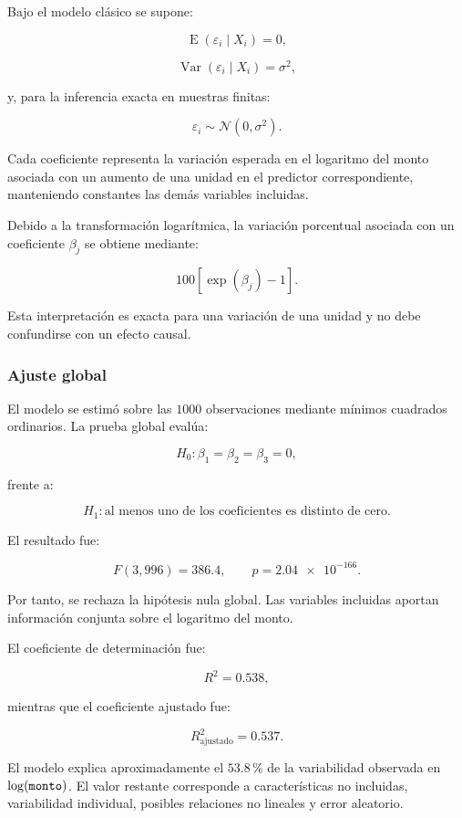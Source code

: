 Bajo el modelo clásico se supone:

\[
\operatorname{E}(\varepsilon_i\mid X_i)=0,
\]

\[
\operatorname{Var}(\varepsilon_i\mid X_i)=\sigma^2,
\]

y, para la inferencia exacta en muestras finitas:

\[
\varepsilon_i
\sim
\mathcal{N}(0,\sigma^2).
\]

Cada coeficiente representa la variación esperada en el logaritmo del
monto asociada con un aumento de una unidad en el predictor
correspondiente, manteniendo constantes las demás variables incluidas.

Debido a la transformación logarítmica, la variación porcentual asociada
con un coeficiente \(\beta_j\) se obtiene mediante:

\[
100\left[\exp(\beta_j)-1\right].
\]

Esta interpretación es exacta para una variación de una unidad y no debe
confundirse con un efecto causal.

\subsubsection{Ajuste global}

El modelo se estimó sobre las \(1000\) observaciones mediante mínimos
cuadrados ordinarios. La prueba global evalúa:

\[
H_0:
\beta_1=\beta_2=\beta_3=0,
\]

frente a:

\[
H_1:
\text{al menos uno de los coeficientes es distinto de cero}.
\]

El resultado fue:

\[
F(3,996)=386.4,
\qquad
p=\num{2.04e-166}.
\]

Por tanto, se rechaza la hipótesis nula global. Las variables incluidas
aportan información conjunta sobre el logaritmo del monto.

El coeficiente de determinación fue:

\[
R^2=0.538,
\]

mientras que el coeficiente ajustado fue:

\[
R^2_{\mathrm{ajustado}}=0.537.
\]

El modelo explica aproximadamente el \(53.8\,\%\) de la variabilidad
observada en \(\log(\texttt{monto})\). El valor restante corresponde a
características no incluidas, variabilidad individual, posibles
relaciones no lineales y error aleatorio.

